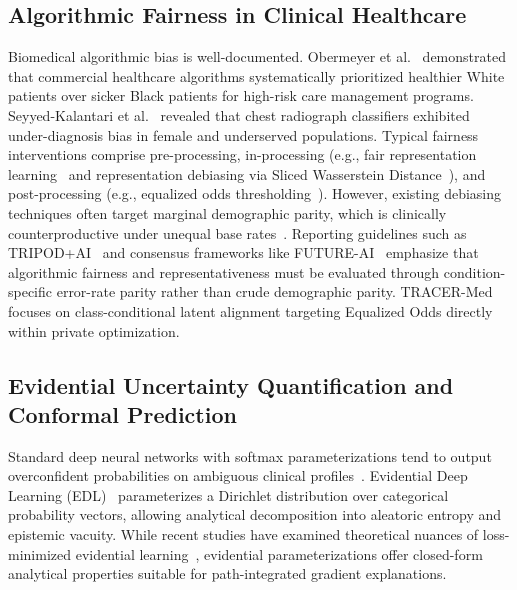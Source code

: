 \documentclass[3p,12pt]{elsarticle}
\theoremstyle{plain}
\theoremstyle{definition}
\begin{document}
\subsection{Algorithmic Fairness in Clinical Healthcare}
Biomedical algorithmic bias is well-documented. Obermeyer et al.~\cite{obermeyer2019dissecting} demonstrated that commercial healthcare algorithms systematically prioritized healthier White patients over sicker Black patients for high-risk care management programs. Seyyed-Kalantari et al.~\cite{seyyed2021underdiagnosis} revealed that chest radiograph classifiers exhibited under-diagnosis bias in female and underserved populations. Typical fairness interventions comprise pre-processing, in-processing (e.g., fair representation learning~\cite{zemel2013learning} and representation debiasing via Sliced Wasserstein Distance~\cite{bonneel2015sliced,rabin2012wasserstein,kolouri2019generalized}), and post-processing (e.g., equalized odds thresholding~\cite{hardt2016equality}). However, existing debiasing techniques often target marginal demographic parity, which is clinically counterproductive under unequal base rates~\cite{barocas2019fairness,chouldechova2017fair,kleinberg2016inherent}. Reporting guidelines such as TRIPOD+AI~\cite{tripodai2024} and consensus frameworks like FUTURE-AI~\cite{futureai2023} emphasize that algorithmic fairness and representativeness must be evaluated through condition-specific error-rate parity rather than crude demographic parity. TRACER-Med focuses on class-conditional latent alignment targeting Equalized Odds directly within private optimization.

\subsection{Evidential Uncertainty Quantification and Conformal Prediction}
Standard deep neural networks with softmax parameterizations tend to output overconfident probabilities on ambiguous clinical profiles~\cite{kompa2021second,lakshminarayanan2017simple,gal2016dropout}. Evidential Deep Learning (EDL)~\cite{sensoy2018evidential} parameterizes a Dirichlet distribution over categorical probability vectors, allowing analytical decomposition into aleatoric entropy and epistemic vacuity. While recent studies have examined theoretical nuances of loss-minimized evidential learning~\cite{bengs2022pitfalls,charpentier2020posterior}, evidential parameterizations offer closed-form analytical properties suitable for path-integrated gradient explanations.
\end{document}
